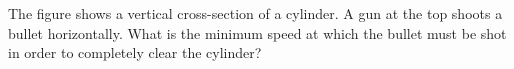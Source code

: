 %
The figure shows a vertical cross-section of a cylinder. A gun at the top
shoots a bullet horizontally. What is the minimum speed at which the bullet
must be shot in order to completely clear the cylinder?
